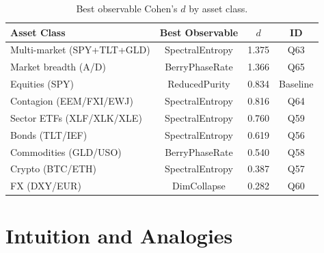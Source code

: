 \documentclass[11pt,a4paper]{article}
\begin{document}
\begin{table}[H]
\centering
\caption{Best observable Cohen's $d$ by asset class.}
\begin{tabular}{@{}lccc@{}}
\toprule
\textbf{Asset Class} & \textbf{Best Observable} & \textbf{$d$} & \textbf{ID} \\
\midrule
Multi-market (SPY+TLT+GLD) & SpectralEntropy & 1.375 & Q63 \\
Market breadth (A/D) & BerryPhaseRate & 1.366 & Q65 \\
Equities (SPY) & ReducedPurity & 0.834 & Baseline \\
Contagion (EEM/FXI/EWJ) & SpectralEntropy & 0.816 & Q64 \\
Sector ETFs (XLF/XLK/XLE) & SpectralEntropy & 0.760 & Q59 \\
Bonds (TLT/IEF) & SpectralEntropy & 0.619 & Q56 \\
Commodities (GLD/USO) & BerryPhaseRate & 0.540 & Q58 \\
Crypto (BTC/ETH) & SpectralEntropy & 0.387 & Q57 \\
FX (DXY/EUR) & DimCollapse & 0.282 & Q60 \\
\bottomrule
\end{tabular}
\end{table}

\section{Intuition and Analogies}
\end{document}
